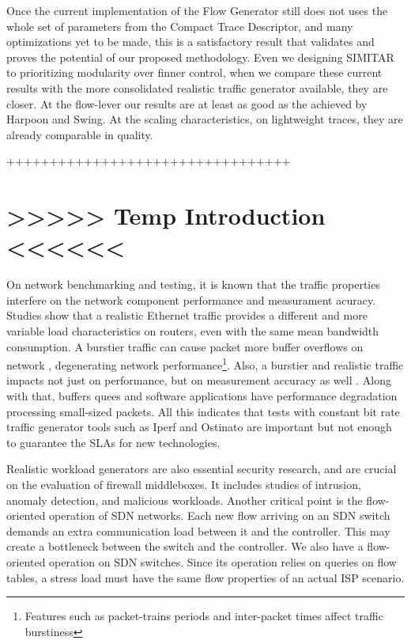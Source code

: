 Once the current implementation of the Flow Generator still does not uses the whole set of parameters from the Compact Trace Descriptor, and many optimizations yet to be made, this is a satisfactory result that validates and proves the potential of our proposed methodology. Even we designing  SIMITAR  to prioritizing modularity over finner control, when we compare these current results with the more consolidated realistic traffic generator available, they are closer. At the flow-lever our results are at least as good as the achieved by Harpoon\cite{harpoon-paper} and Swing\cite{swing-paper}. At the scaling characteristics, on lightweight traces, they are already comparable in quality.




+++++++++++++++++++++++++++++++++

\section{>>>>> Temp Introduction <<<<<< }\label{sec:introduction-temp}

On network benchmarking and testing, it is known that the traffic properties interfere on the network component performance\cite{burstiness-queue-lenght}\cite{harpoon-validation} and measurament acuracy\cite{swing-paper}. Studies show that a realistic Ethernet traffic provides a different and more variable load characteristics on routers\cite{harpoon-validation}, even with the same mean bandwidth consumption. A burstier traffic can cause packet more buffer overflows on network \cite{burstiness-queue-lenght} \cite{modelling-of-self-similar} \cite{empirical-interarrival-study}, degenerating network performance\footnote{Features such as packet-trains periods and inter-packet times affect traffic burstiness}. Also, a burstier and realistic traffic  impacts not just on performance, but on measurement accuracy as well \cite{legotg-paper} \cite{background-traffic-matter}. Along with that, buffers quees and software applications have performance degradation processing small-sized packets. All this indicates that tests with constant bit rate traffic generator tools such as Iperf and Ostinato are important but not enough to guarantee the SLAs for new technologies. 


Realistic workload generators are also essential security research\cite{ditg-paper}, and are crucial on the evaluation of firewall middleboxes. It includes studies of intrusion, anomaly detection, and malicious workloads\cite{ditg-paper}. Another critical point is the flow-oriented operation of SDN networks. Each new flow arriving on an SDN switch demands an extra communication load between it and the controller. This may create a bottleneck between the switch and the controller. We also have a flow-oriented operation on SDN switches. Since its operation relies on queries on flow tables, a stress load must have the same flow properties of an actual ISP scenario. 


